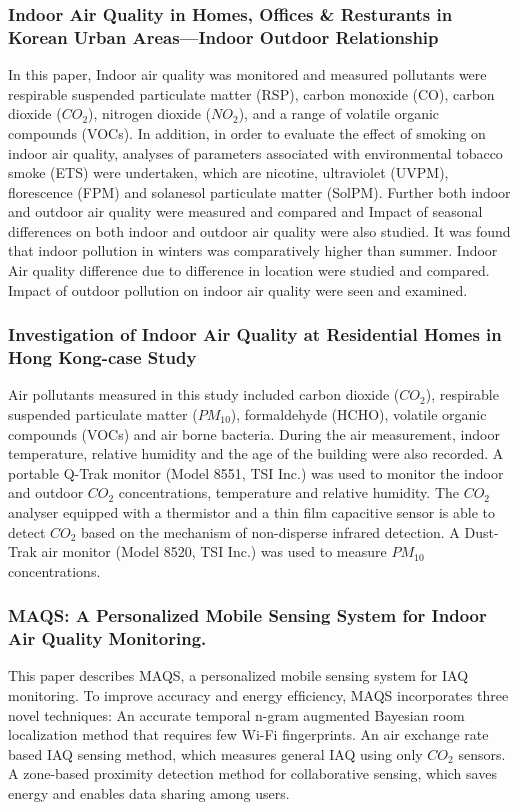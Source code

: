 \subsubsection{Indoor Air Quality in Homes, Offices \& Resturants in Korean Urban Areas—Indoor Outdoor Relationship \cite{16}}
In this paper, Indoor air quality was monitored and measured pollutants were respirable suspended particulate matter (RSP), carbon monoxide (CO), carbon dioxide ($CO_2$), nitrogen dioxide ($NO_2$), and a range of volatile organic compounds (VOCs). In addition, in order to evaluate the effect of smoking on indoor air quality, analyses of parameters associated with environmental tobacco smoke (ETS) were undertaken, which are nicotine, ultraviolet (UVPM), florescence (FPM) and solanesol particulate matter (SolPM). Further both indoor and outdoor air quality were measured and compared and Impact of seasonal differences on both indoor and outdoor air quality were also studied. It was found that indoor pollution in winters was comparatively higher than summer. Indoor Air quality difference due to difference in location were studied and compared. Impact of outdoor pollution on indoor air quality were seen and examined.

\subsubsection{Investigation of Indoor Air Quality at Residential Homes in Hong Kong-case Study \cite{17}}
 Air pollutants measured in this study included carbon dioxide ($CO_2$), respirable suspended particulate matter ($PM_{10}$), formaldehyde (HCHO), volatile organic compounds (VOCs) and air borne bacteria. During the air measurement, indoor temperature, relative humidity and the age of the building were also recorded. A portable Q-Trak monitor (Model 8551, TSI Inc.) was used to monitor the indoor and outdoor $CO_2$ concentrations, temperature and relative humidity. The $CO_2$ analyser equipped with a thermistor and a thin ﬁlm capacitive sensor is able to detect $CO_2$ based on the mechanism of non-disperse infrared detection. A Dust-Trak air monitor (Model 8520, TSI Inc.) was used to measure $PM_{10}$ concentrations.

\subsubsection{MAQS: A Personalized Mobile Sensing System for Indoor Air Quality Monitoring. \cite{18}}
This paper describes MAQS, a personalized mobile sensing system for IAQ monitoring.
To improve accuracy and energy efﬁciency, MAQS incorporates three novel techniques:
An accurate temporal n-gram augmented Bayesian room localization method that requires few Wi-Fi ﬁngerprints.
An air exchange rate based IAQ sensing method, which measures general IAQ using only $CO_2$ sensors. 
A zone-based proximity detection method for collaborative sensing, which saves energy and enables data sharing among users.

